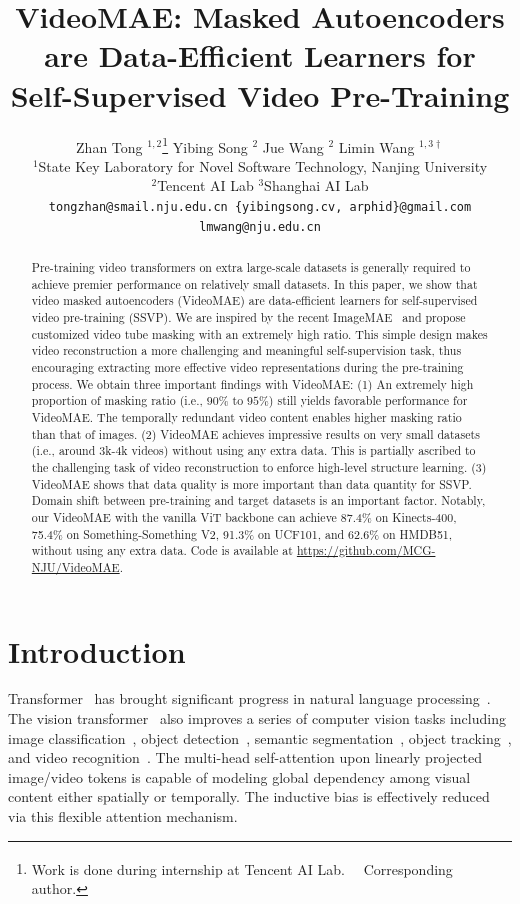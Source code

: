\documentclass{article}
\title{VideoMAE: Masked Autoencoders are Data-Efficient Learners for Self-Supervised Video Pre-Training}
\author{%
Zhan Tong $^{1, 2}$\thanks{Work is done during internship at Tencent AI Lab. ~~\textsuperscript{\dag}Corresponding author. } \quad
Yibing Song $^{2}$ \quad
Jue Wang $^{2}$ \quad
Limin Wang $^{1,3\dagger}$\vspace{0.2em}\\
$^{1}$State Key Laboratory for Novel Software Technology, Nanjing University \\ $^{2}$Tencent AI Lab \quad \quad $^{3}$Shanghai AI Lab \vspace{.2em}\\
{\tt\small{tongzhan@smail.nju.edu.cn \quad \{yibingsong.cv, arphid\}@gmail.com \quad lmwang@nju.edu.cn}} \\
}
\begin{document}
\maketitle


\begin{abstract}
Pre-training video transformers on extra large-scale datasets is generally required to achieve premier performance on relatively small datasets.
In this paper, we show that video masked autoencoders (VideoMAE) are data-efficient learners for self-supervised video pre-training (SSVP). We are inspired by the recent ImageMAE~\cite{he2021masked} and propose customized video tube masking with an extremely high ratio. 
This simple design makes video reconstruction a more challenging and meaningful self-supervision task, thus encouraging extracting more effective video representations during the pre-training process.
We obtain three important findings with VideoMAE: 
(1) An extremely high proportion of masking ratio (i.e., $90\%$ to $95\%$) still yields favorable performance for VideoMAE. The temporally redundant video content enables higher masking ratio than that of images.
(2) VideoMAE achieves impressive results on very small datasets (i.e., around 3k-4k videos) without using any extra data. This is partially ascribed to the challenging task of video reconstruction to enforce high-level structure learning. 
(3) VideoMAE shows that data quality is more important than data quantity for SSVP. Domain shift between pre-training and target datasets is an important factor. Notably, our VideoMAE with the vanilla ViT backbone can achieve 87.4\% on Kinects-400, 75.4\% on Something-Something V2, 91.3\% on UCF101, and 62.6\% on HMDB51, without using any extra data. Code is available at \href{https://github.com/MCG-NJU/VideoMAE}{https://github.com/MCG-NJU/VideoMAE}.
\end{abstract}

\section{Introduction}
Transformer~\cite{attention} has brought significant progress in natural language processing~\cite{devlin2019bert,Brown2020,Radford2018}. The vision transformer~\cite{vit} also improves a series of computer vision tasks including image classification~\cite{deit,deepvit}, object detection~\cite{detr,swin}, semantic segmentation~\cite{segformer}, object tracking~\cite{ChenYZ0YL21,mixformer}, and video recognition~\cite{timesformer,vivit}. The multi-head self-attention upon linearly projected image/video tokens is capable of modeling global dependency among visual content either spatially or temporally. The inductive bias is effectively reduced via this flexible attention mechanism. 
\end{document}
